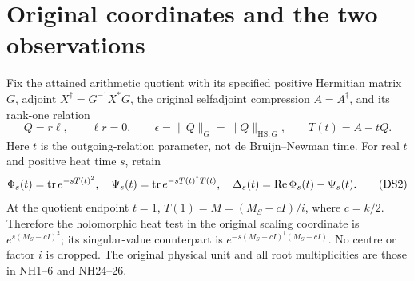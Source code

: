 \section{Original coordinates and the two observations}
Fix the attained arithmetic quotient with its specified positive
Hermitian matrix \(G\), adjoint \(X^\dagger=G^{-1}X^*G\), the original
selfadjoint compression \(A=A^\dagger\), and its rank-one relation
\[
 Q=r\ell,\qquad \ell r=0,\qquad
 \epsilon=\|Q\|_G=\|Q\|_{\mathrm{HS},G},\qquad T(t)=A-tQ .
 \tag{DS1}
\]
Here \(t\) is the outgoing-relation parameter, not de Bruijn--Newman
time. For real \(t\) and positive heat time \(s\), retain
\[
 \Phi_s(t)=\operatorname{tr} e^{-sT(t)^2},\quad
 \Psi_s(t)=\operatorname{tr} e^{-sT(t)^\dagger T(t)},\quad
 \Delta_s(t)=\operatorname{Re}\Phi_s(t)-\Psi_s(t).
 \tag{DS2}
\]
At the quotient endpoint \(t=1\), \(T(1)=M=(M_S-cI)/i\), where
\(c=k/2\). Therefore the holomorphic heat test in the original scaling
coordinate is \(e^{s(M_S-cI)^2}\); its singular-value counterpart is
\(e^{-s(M_S-cI)^\dagger(M_S-cI)}\). No centre or factor \(i\) is dropped.
The original physical unit and all root multiplicities are those in
NH1--6 and NH24--26.

